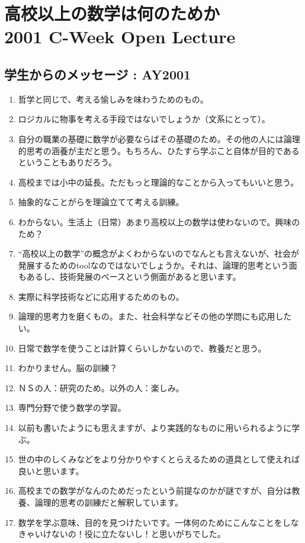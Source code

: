 \documentclass[twocolumn]{jarticle}
\begin{document}
\section*{高校以上の数学は何のためか\\
2001 C-Week Open Lecture}
\subsection*{学生からのメッセージ : AY2001}
\begin{enumerate}
\item 哲学と同じで、考える愉しみを味わうためのもの。
\item ロジカルに物事を考える手段ではないでしょうか（文系にとって）。
\item 自分の職業の基礎に数学が必要ならばその基礎のため。その他の人には論理的思考の涵養が主だと思う。もちろん、ひたすら学ぶこと自体が目的であるということもありだろう。
\item 高校までは小中の延長。ただもっと理論的なことから入ってもいいと思う。
\item 抽象的なことがらを理論立てて考える訓練。
\item わからない。生活上（日常）あまり高校以上の数学は使わないので。興味のため？
\item “高校以上の数学”の概念がよくわからないのでなんとも言えないが、社会が発展するためのtoolなのではないでしょうか。それは、論理的思考という面もあるし、技術発展のベースという側面があると思います。
\item 実際に科学技術などに応用するためのもの。
\item 論理的思考力を磨くもの。また、社会科学などその他の学問にも応用したい。
\item 日常で数学を使うことは計算くらいしかないので、教養だと思う。
\item わかりません。脳の訓練？
\item ＮＳの人：研究のため。以外の人：楽しみ。
\item 専門分野で使う数学の学習。
\item 以前も書いたようにも思えますが、より実践的なものに用いられるように学ぶ。
\item 世の中のしくみなどをより分かりやすくとらえるための道具として使えれば良いと思います。
\item 高校までの数学がなんのためだったという前提なのかが謎ですが、自分は教養、論理的思考の訓練だと解釈しています。
\item 数学を学ぶ意味、目的を見つけたいです。一体何のためにこんなことをしなきゃいけないの！役に立たないし！と思いがちでした。

\end{enumerate}
\end{document}
